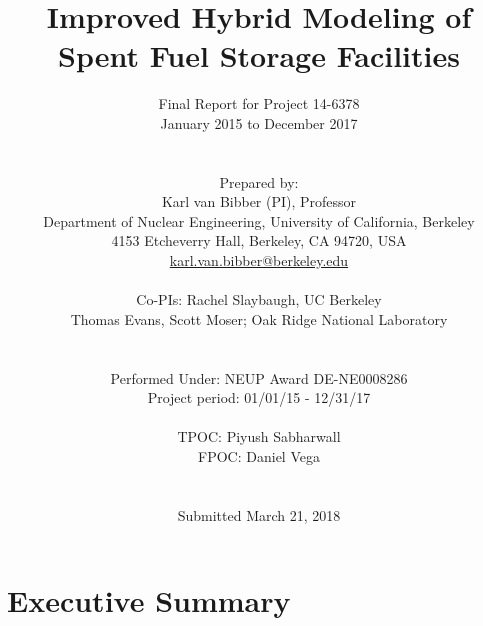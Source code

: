 \documentclass[12pt]{article}
\title{Improved Hybrid Modeling of Spent Fuel Storage Facilities}
\author{ 
  Final Report for Project 14-6378\\
  January 2015 to December 2017\\
  \\
  \\
  Prepared by:\\
  Karl van Bibber (PI), Professor \\
  Department of Nuclear Engineering, University of California, Berkeley \\
  4153 Etcheverry Hall, Berkeley, CA 94720, USA\\
  \href{mailto:karl.van.bibber@berkeley.edu}{karl.van.bibber@berkeley.edu}\\
  \\
 Co-PIs: Rachel Slaybaugh, UC Berkeley\\
  Thomas Evans, Scott Moser; Oak Ridge National Laboratory\\
  \\
  \\
  Performed Under: NEUP Award DE-NE0008286\\
  Project period: 01/01/15 - 12/31/17 \\
  \\ 
  TPOC: Piyush Sabharwall\\
  FPOC: Daniel Vega\\
  \\
  \\
  Submitted March 21, 2018
}
\begin{document}


\maketitle
\clearpage
\tableofcontents
\clearpage
%

%
\section{Executive Summary}
\label{sect::summary}

\end{document}
